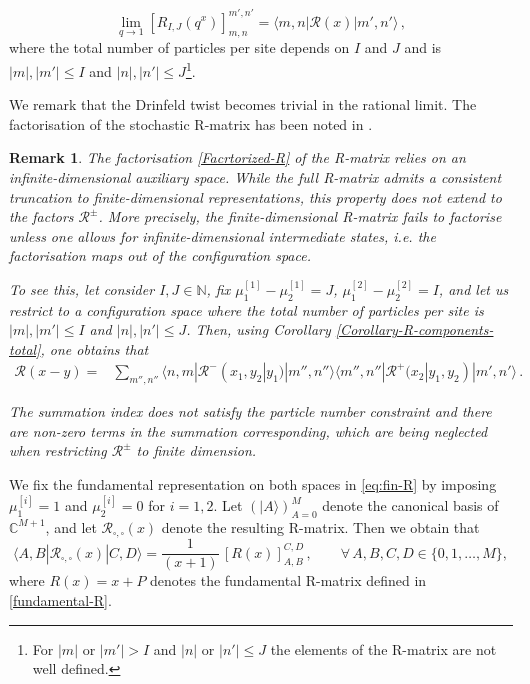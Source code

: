 \documentclass[11pt]{article}
\numberwithin{equation}{section}
\newtheorem{remark}[theorem]{Remark}
\newcommand{\M}{M}
\newcommand{\eR}{\mathcal{R}}
\newcommand{\fundR}{R}
\begin{document}
    \begin{equation}\label{eq:fin-R} 
        \lim_{q\to 1}\left[R_{I,J}(q^{x})\right]_{m,n}^{m',n'}=\langle m,n|\eR(x)|m',n'\rangle\,,
    \end{equation}
    where the total number of particles per site depends on $I$ and $J$ and is $|m|,|m'|\leq I$ and $|n|,|n'|\leq J$\footnote{For $|m|$ or $|m'|> I$ and $|n|$ or $|n'|\leq J$ the elements of the R-matrix are not well defined.}.

    We remark that the Drinfeld twist becomes trivial in the rational limit.  The factorisation of the stochastic R-matrix has been noted in \cite[(5.7)]{Bosnjak:2016oze}.     
    
    \begin{remark}\label{Remark-factorisationFail}
The factorisation  \eqref{Facrtorized-R} of the R-matrix relies on an infinite-dimensional auxiliary space. While the full R-matrix admits a consistent truncation to finite-dimensional representations, this property does not extend to the factors $\eR^{\pm}$. More precisely, the finite-dimensional R-matrix fails to factorise unless one allows for infinite-dimensional intermediate states, i.e. the factorisation maps out of the configuration space.
    
 To see this, let consider $I, J\in \mathbb{N}$, fix $\mu_{1}^{[1]}-\mu_{2}^{[1]}=J$, $\mu_{1}^{[2]}-\mu_{2}^{[2]}=I$, and let us restrict to a configuration space where the total number of particles per site is $|m|,|m'|\leq I$ and $|n|,|n'|\leq J$. Then, using Corollary \ref{Corollary-R-components-total}, one obtains that 
\begin{equation}
    \begin{split}
    \eR(x-y)=    &\sum_{m'',{n}''}\langle {n},{m}|\eR^{-}(x_{1},y_{2}|y_{1})|{m}'',{n}''\rangle\langle {m}'',{n}''|\eR^{+}(x_{2}|y_{1},y_{2})|{m}',{n}'\rangle \,.
                  \end{split}
\end{equation}

The summation index  does not satisfy the particle number constraint and there are non-zero terms in the summation corresponding, which are being neglected when restricting $\eR^{\pm}$ to finite dimension. \end{remark}

   
  
    



   We fix the fundamental representation on both spaces in \eqref{eq:fin-R} by imposing $\mu_1^{[i]}=1$ and $\mu_2^{[i]}=0$ for $i=1,2$. Let $(|A\rangle)_{A=0}^{\M}$ denote the canonical basis of $\mathbb{C}^{\M+1}$, and let $\eR_{\square,\square}(x)$ denote the resulting R-matrix. Then we obtain that
\begin{equation}\label{R-double-fund}
\langle A,B|\eR_{\square,\square}(x)|C,D\rangle
=\frac{1}{(x+1)}\,
[\fundR(x)]^{C,D}_{A,B}\,,
\qquad \forall\, A,B,C,D\in \{0,1,\ldots,\M\},
\end{equation}
where $\fundR(x)=x+P$ denotes the fundamental R-matrix defined in \eqref{fundamental-R}.
\end{document}
